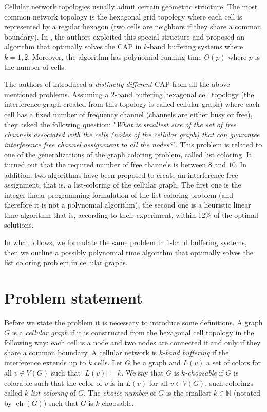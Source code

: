 \documentclass[letterpaper, 10 pt, conference]{ieeeconf}  %
\DeclareMathOperator*{\ch}{ch}
\begin{document}
Cellular network topologies usually admit certain geometric structure. The most common network topology is the hexagonal grid topology where each cell is represented by a regular hexagon (two cells are neighbors if they share a common boundary). In \cite{662943}, the authors exploited this special structure and proposed an algorithm that optimally solves the CAP in $k$-band buffering systems where $k=1,2$. Moreover, the algorithm has polynomial running time $O(p)$ where $p$ is the number of cells.

The authors of \cite{7248845} introduced a \textit{distinctly different} CAP from all the above mentioned problems. Assuming a $2$-band buffering hexagonal cell topology (the interference graph created from this topology is called cellular graph) where each cell has a fixed number of frequency channel (channels are either busy or free), they asked the following question: "\textit{What is smallest size of the set of free channels associated with the cells (nodes of the cellular graph) that can guarantee interference free channel assignment to all the nodes?}". This problem is related to one of the generalizations of the graph coloring problem, called list coloring. It turned out that the required number of free channels is between $8$ and $10$. In addition, two algorithms have been proposed to create an interference free assignment, that is, a list-coloring of the cellular graph. The first one is the integer linear programming formulation of the list coloring problem (and therefore it is not a polynomial algorithm), the second one is a heuristic linear time algorithm that is, according to their experiment, within 12\% of the optimal solutions.

In what follows, we formulate the same problem in $1$-band buffering systems, then we outline a possibly polynomial time algorithm that optimally solves the list coloring problem in cellular graphs.

\section{Problem statement}

Before we state the problem it is necessary to introduce some definitions. A graph $G$ is a  \textit{cellular graph} if it is constructed from the hexagonal cell topology in the following way: each cell is a node and two nodes are connected if and only if they share a common boundary.
A cellular network is $k$\textit{-band buffering} if the interference extends up to $k$ cells.
Let $G$ be a graph and $L(v)$ a set of colors for all $v \in V(G)$ such that $|L(v)|=k$. We say that $G$ is $k$\textit{-choosable} if $G$ is colorable such that the color of $v$ is in $L(v)$ for all $v \in V(G)$, such colorings called $k$\textit{-list coloring} of $G$. The \textit{choice number} of $G$ is the smallest $k \in \mathbb{N}$ (notated by $\ch(G)$) such that $G$ is $k$-choosable.
\end{document}
